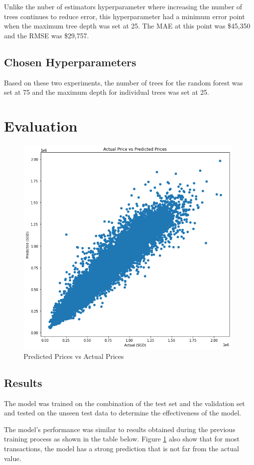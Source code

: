 \documentclass[[12pt,conference]{IEEEtran}
\begin{document}
Unlike the nuber of estimators hyperparameter where increasing the number of trees continues to reduce error, this hyperparameter had a minimum error point when the maximum tree depth was set at 25. The MAE at this point was \$45,350 and the RMSE was \$29,757.

\subsection{Chosen Hyperparameters}
Based on these two experiments, the number of trees for the random forest was set at 75 and the maximum depth for individual trees was set at 25. 


\section{Evaluation}

\begin{figure}[H]
    \centering
    \includegraphics[width=0.75\linewidth]{actual-predicted.png}
    \caption{Predicted Prices vs Actual 
Prices}
    \label{fig:evaluation}
\end{figure}

\subsection{Results}

The model was trained on the combination of the test set and the validation set and tested on the unseen test data to determine the effectiveness of the model. 

The model's performance was similar to results obtained during the previous training process as shown in the table below. Figure \ref{fig:evaluation} also show that for most transactions, the model has a strong prediction that is not far from the actual value. 
\end{document}
